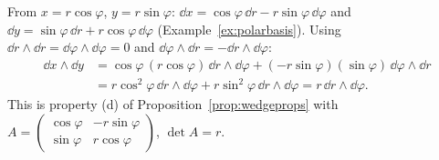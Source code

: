 \begin{example}\label{ex:polarwedge}
From $x=r\cos\varphi$, $y=r\sin\varphi$: $\dd x=\cos\varphi\,\dd r-r\sin\varphi\,\dd\varphi$ and
$\dd y=\sin\varphi\,\dd r+r\cos\varphi\,\dd\varphi$ (Example~\ref{ex:polarbasis}). Using $\dd r\wedge\dd r=\dd\varphi\wedge\dd\varphi=0$ and
$\dd\varphi\wedge\dd r=-\dd r\wedge\dd\varphi$:
\begin{align*}
\dd x\wedge\dd y&=\cos\varphi\,(r\cos\varphi)\,\dd r\wedge\dd\varphi+(-r\sin\varphi)(\sin\varphi)\,\dd\varphi\wedge\dd r\\
&=r\cos^2\varphi\,\dd r\wedge\dd\varphi+r\sin^2\varphi\,\dd r\wedge\dd\varphi=r\,\dd r\wedge\dd\varphi .
\end{align*}
This is property (d) of Proposition~\ref{prop:wedgeprops} with $A=\begin{pmatrix}\cos\varphi&-r\sin\varphi\\ \sin\varphi&r\cos\varphi\end{pmatrix}$, $\det A=r$.
\end{example}
